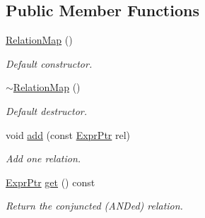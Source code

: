 \subsection*{Public Member Functions}
\begin{DoxyCompactItemize}
\item 
\mbox{\label{classilang_1_1_relation_map_ac11eda6555d38a1174843413ea7bf133}} 
\mbox{\hyperlink{classilang_1_1_relation_map_ac11eda6555d38a1174843413ea7bf133}{Relation\+Map}} ()
\begin{DoxyCompactList}\small\item\em Default constructor. \end{DoxyCompactList}\item 
\mbox{\label{classilang_1_1_relation_map_ac3cb8bce777f37e705ffa0bcac62ddcf}} 
\mbox{\hyperlink{classilang_1_1_relation_map_ac3cb8bce777f37e705ffa0bcac62ddcf}{$\sim$\+Relation\+Map}} ()
\begin{DoxyCompactList}\small\item\em Default destructor. \end{DoxyCompactList}\item 
\mbox{\label{classilang_1_1_relation_map_ada615b06d8cbd4e8e525b89ac4fed7db}} 
void \mbox{\hyperlink{classilang_1_1_relation_map_ada615b06d8cbd4e8e525b89ac4fed7db}{add}} (const \mbox{\hyperlink{namespaceilang_a7c4196c72e53ea4df4b7861af7bc3bce}{Expr\+Ptr}} rel)
\begin{DoxyCompactList}\small\item\em Add one relation. \end{DoxyCompactList}\item 
\mbox{\label{classilang_1_1_relation_map_a025d3d087fffa48fe20e23f8640e49b9}} 
\mbox{\hyperlink{namespaceilang_a7c4196c72e53ea4df4b7861af7bc3bce}{Expr\+Ptr}} \mbox{\hyperlink{classilang_1_1_relation_map_a025d3d087fffa48fe20e23f8640e49b9}{get}} () const
\begin{DoxyCompactList}\small\item\em Return the conjuncted (A\+N\+Ded) relation. \end{DoxyCompactList}\end{DoxyCompactItemize}
